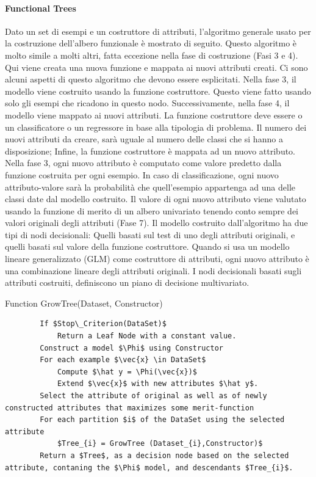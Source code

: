 \paragraph{Functional Trees}
Dato un set di esempi e un costruttore di attributi, l'algoritmo generale usato per la costruzione dell'albero funzionale è mostrato di seguito. Questo algoritmo è molto simile a molti altri, fatta eccezione nella fase di costruzione (Fasi 3 e 4). Qui viene creata una nuova funzione e mappata ai nuovi attributi creati. Ci sono alcuni aspetti di questo algoritmo che devono essere esplicitati. Nella fase 3, il modello viene costruito usando la funzione costruttore. Questo viene fatto usando solo gli esempi che ricadono in questo nodo. Successivamente, nella fase 4, il modello viene mappato ai nuovi attributi. La funzione costruttore deve essere o un classificatore o un regressore in base alla tipologia di problema. Il numero dei nuovi attributi da creare, sarà uguale al numero delle classi che si hanno a disposizione; Infine, la funzione costruttore è mappata ad un nuovo attributo. Nella fase 3, ogni nuovo attributo è computato come valore predetto dalla funzione costruita per ogni esempio. In caso di classificazione, ogni nuovo attributo-valore sarà la probabilità che quell'esempio appartenga ad una delle classi date dal modello costruito.
Il valore di ogni nuovo attributo viene valutato usando la funzione di merito di un albero univariato tenendo conto sempre dei valori originali degli attributi (Fase 7). Il modello costruito dall'algoritmo ha due tipi di nodi decisionali: Quelli basati sul test di uno degli attributi originali, e quelli basati sul valore della funzione costruttore. Quando si usa un modello lineare generalizzato (GLM) come costruttore di attributi, ogni nuovo attributo è una combinazione lineare degli attributi originali. I nodi decisionali basati sugli attributi costruiti, definiscono un piano di decisione multivariato.

\begin{algorithm}
	\caption{Function GrowTree(Dataset, Constructor)}
	\begin{lstlisting}
		If $Stop\_Criterion(DataSet)$
			Return a Leaf Node with a constant value.
		Construct a model $\Phi$ using Constructor
		For each example $\vec{x} \in DataSet$
			Compute $\hat y = \Phi(\vec{x})$
			Extend $\vec{x}$ with new attributes $\hat y$.
		Select the attribute of original as well as of newly constructed attributes that maximizes some merit-function
		For each partition $i$ of the DataSet using the selected attribute
			$Tree_{i} = GrowTree (Dataset_{i},Constructor)$
		Return a $Tree$, as a decision node based on the selected attribute, contaning the $\Phi$ model, and descendants $Tree_{i}$.
	\end{lstlisting}
\end{algorithm}

